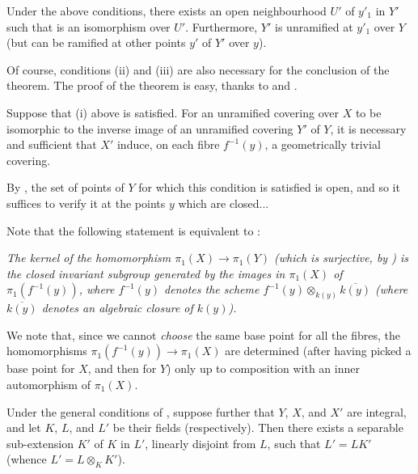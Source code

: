 \begin{theorem}\label{fga2-theorem-11}
    Under the above conditions, there exists an open neighbourhood $U'$ of $y'_1$ in $Y'$ such that  is an isomorphism over $U'$.
    Furthermore, $Y'$ is unramified at $y'_1$ over $Y$ (but can be ramified at other points $y'$ of $Y'$ over $y$).
\end{theorem}


\begin{cproof}
    Of course, conditions (ii) and (iii) are also necessary for the conclusion of the theorem.
    The proof of the theorem is easy, thanks to  and .
\end{cproof}

\begin{corollary}\label{fga2-theorem-11-corollary-1}
    Suppose that (i) above is satisfied.
    For an unramified covering over $X$ to be isomorphic to the inverse image of an unramified covering $Y'$ of $Y$, it is necessary and sufficient that $X'$ induce, on each fibre $f^{-1}(y)$, a geometrically trivial covering.
\end{corollary}


\begin{cproof}
    By , the set of points of $Y$ for which this condition is satisfied is open, and so it suffices to verify it at the points $y$ which are closed...
\end{cproof}


Note that the following statement is equivalent to :

\emph{The kernel of the homomorphism $\pi_1(X)\to\pi_1(Y)$ (which is surjective, by ) is the closed invariant subgroup generated by the images in $\pi_1(X)$ of $\pi_1(f^{-1}(y))$, where $f^{-1}(y)$ denotes the scheme $f^{-1}(y)\otimes_{k(y)}\overline{k(y)}$ (where $\overline{k(y)}$ denotes an algebraic closure of $k(y)$).}

We note that, since we cannot \emph{choose} the same base point for all the fibres, the homomorphisms $\pi_1(f^{-1}(y))\to\pi_1(X)$ are determined (after having picked a base point for $X$, and then for $Y$) only up to composition with an inner automorphism of $\pi_1(X)$.


\begin{corollary}\label{fga2-theorem-11-corollary-2}
    Under the general conditions of , suppose further that $Y$, $X$, and $X'$ are integral, and let $K$, $L$, and $L'$ be their fields (respectively).
    Then there exists a separable sub-extension $K'$ of $K$ in $L'$, linearly disjoint from $L$, such that $L'=LK'$ (whence $L'=L\otimes_KK'$).
\end{corollary}

